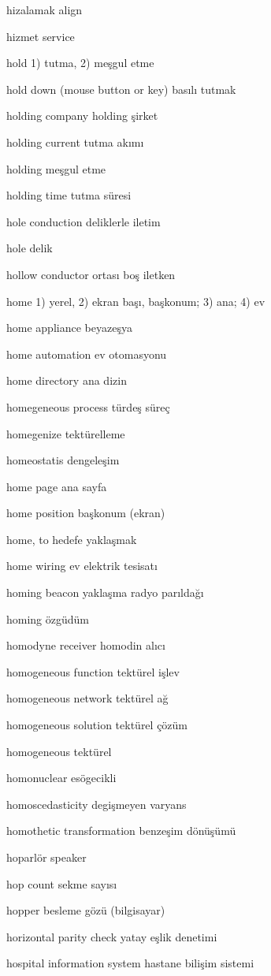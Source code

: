 \documentclass[12pt,fleqn]{article}\usepackage{../../common}
\begin{document}
hizalamak align

hizmet service

hold 1) tutma, 2) meşgul etme

hold down (mouse button or key) basılı tutmak

holding company holding şirket

holding current tutma akımı

holding meşgul etme

holding time tutma süresi

hole conduction deliklerle iletim

hole delik

hollow conductor ortası boş iletken

home 1) yerel, 2) ekran başı, başkonum; 3) ana; 4) ev

home appliance beyazeşya

home automation ev otomasyonu

home directory ana dizin

homegeneous process türdeş süreç

homegenize tektürelleme

homeostatis dengeleşim

home page ana sayfa

home position başkonum (ekran)

home, to hedefe yaklaşmak

home wiring ev elektrik tesisatı

homing beacon yaklaşma radyo parıldağı

homing özgüdüm

homodyne receiver homodin alıcı

homogeneous function tektürel işlev

homogeneous network tektürel ağ

homogeneous solution tektürel çözüm

homogeneous tektürel

homonuclear esögecikli

homoscedasticity degişmeyen varyans

homothetic transformation benzeşim dönüşümü

hoparlör speaker

hop count sekme sayısı

hopper besleme gözü (bilgisayar)

horizontal parity check yatay eşlik denetimi

hospital information system hastane bilişim sistemi
\end{document}
